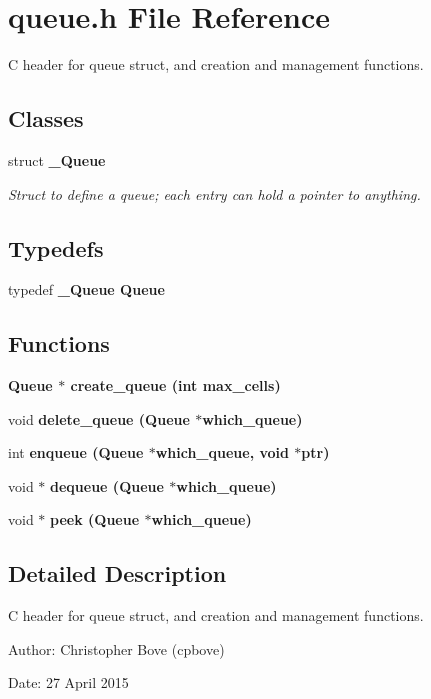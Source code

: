 \section{queue.h File Reference}
\label{queue_8h}
C header for queue struct, and creation and management functions. 

\subsection*{Classes}
\begin{CompactItemize}
\item 
struct \bf{\_\-Queue}
\begin{CompactList}\small\item\em Struct to define a queue; each entry can hold a pointer to anything. \item\end{CompactList}\end{CompactItemize}
\subsection*{Typedefs}
\begin{CompactItemize}
\item 
typedef \bf{\_\-Queue} \bf{Queue}
\end{CompactItemize}
\subsection*{Functions}
\begin{CompactItemize}
\item 
\bf{Queue} $\ast$ \bf{create\_\-queue} (int max\_\-cells)
\item 
void \bf{delete\_\-queue} (\bf{Queue} $\ast$which\_\-queue)
\item 
int \bf{enqueue} (\bf{Queue} $\ast$which\_\-queue, void $\ast$ptr)
\item 
void $\ast$ \bf{dequeue} (\bf{Queue} $\ast$which\_\-queue)
\item 
void $\ast$ \bf{peek} (\bf{Queue} $\ast$which\_\-queue)
\end{CompactItemize}


\subsection{Detailed Description}
C header for queue struct, and creation and management functions. 

\begin{Desc}
\item[Author:]Christopher Bove (cpbove) \end{Desc}
\begin{Desc}
\item[Date:]27 April 2015 \end{Desc}


